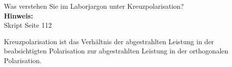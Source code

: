 \begin{question}[section=11,name={Kreuzpolarisation},difficulty=,quantity=4,type=thr,tags={20130625}]
	Was verstehen Sie im Laborjargon unter Kreuzpolarisation?
	\\ \textbf{Hinweis:}\\
	Skript Seite 112
\end{question}
\begin{solution}
	Kreuzpolarisation ist das Verhältnis der abgestrahlten Leistung in der beabsichtigten Polarisation zur abgestrahlten Leistung in der orthogonalen Polarisation.
\end{solution}